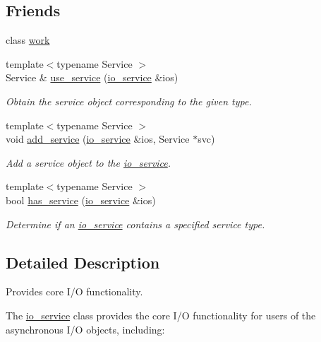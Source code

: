 \subsection*{Friends}
\begin{DoxyCompactItemize}
\item 
class \hyperlink{classasio_1_1io__service_ab4659d3bc91cdcd7ca7a05329278ee88}{work}
\item 
{\footnotesize template$<$typename Service $>$ }\\Service \& \hyperlink{classasio_1_1io__service_a8e909785743737fed207a4c058399d7e}{use\+\_\+service} (\hyperlink{classasio_1_1io__service}{io\+\_\+service} \&ios)
\begin{DoxyCompactList}\small\item\em Obtain the service object corresponding to the given type. \end{DoxyCompactList}\item 
{\footnotesize template$<$typename Service $>$ }\\void \hyperlink{classasio_1_1io__service_a24cdada519607ebd767d5c01d144a48c}{add\+\_\+service} (\hyperlink{classasio_1_1io__service}{io\+\_\+service} \&ios, Service $\ast$svc)
\begin{DoxyCompactList}\small\item\em Add a service object to the \hyperlink{classasio_1_1io__service}{io\+\_\+service}. \end{DoxyCompactList}\item 
{\footnotesize template$<$typename Service $>$ }\\bool \hyperlink{classasio_1_1io__service_aac11cfb5d1790b8dfa320277035e1a5f}{has\+\_\+service} (\hyperlink{classasio_1_1io__service}{io\+\_\+service} \&ios)
\begin{DoxyCompactList}\small\item\em Determine if an \hyperlink{classasio_1_1io__service}{io\+\_\+service} contains a specified service type. \end{DoxyCompactList}\end{DoxyCompactItemize}


\subsection{Detailed Description}
Provides core I/\+O functionality. 

The \hyperlink{classasio_1_1io__service}{io\+\_\+service} class provides the core I/\+O functionality for users of the asynchronous I/\+O objects, including\+:

